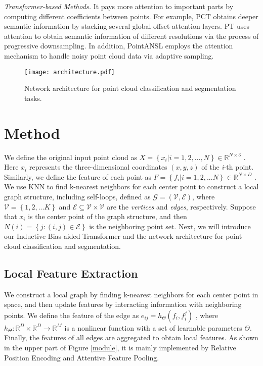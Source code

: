 \documentclass[conference]{IEEEtran}
\begin{document}
\emph{Transformer-based Methods.} It pays more attention to important parts by computing different coefficients between points. For example, PCT \cite{guo2021pct} obtains deeper semantic information by stacking several global offset attention layers. PT \cite{zhao2021point} uses attention to obtain semantic information of different resolutions via the process of progressive downsampling. In addition, PointANSL \cite{yan2020pointasnl} employs the attention mechanism to handle noisy point cloud data via adaptive sampling.

\begin{figure*}[h]
    \centering
   \texttt{[image: architecture.pdf]}
   \vspace{-5pt}
   \caption{Network architecture for point cloud classification and segmentation tasks.}
\label{architecture}
   \vspace{-8pt}
\end{figure*}

\vspace{-0.3cm}

\section{Method}
 We define the original input point cloud as $X=\left\{x_i|i = 1,2,...,N\right\}\in\mathbb{R}^{N\times3}$ . Here $x_i$ represents the three-dimensional coordinates $(x,y,z)$ of the {\emph i}-th point. Similarly, we define the feature of each point as $F=\left\{f_i|i = 1,2,...N\right\}\in\mathbb{R}^{N\times D}$ . We use KNN to find k-nearest neighbors for each center point to construct a local graph structure, including self-loops, defined as $\mathcal{G}=(\mathcal{V},\mathcal{E})$, where $\mathcal{V}=\left\{1,2,...K\right\}$ and $\mathcal{E}\subseteq \mathcal{V}\times\mathcal{V}$ are the {\em vertices} and {\em edges}, respectively. Suppose that $x_i$ is the center point of the graph structure, and then $N(i)=\left\{j:(i,j)\in\mathcal{E}\right\}$ is the neighboring point set. Next, we will introduce our Inductive Bias-aided Transformer and the network architecture for point cloud classification and segmentation.
\subsection{Local Feature Extraction}
We construct a local graph by finding k-nearest neighbors for each center point in space, and then update features by interacting information with neighboring points. We define the feature of the edge as $e_{ij} = h_\Theta(f_i,f_i^j)$ , where $h_\Theta:\mathbb{R}^D \times \mathbb{R}^D \rightarrow \mathbb{R}^{M}$ is a nonlinear function with a set of learnable parameters $\Theta$. Finally, the features of all edges are aggregated to obtain local features. As shown in the upper part of Figure \ref{module}, it is mainly implemented by Relative Position Encoding and Attentive Feature Pooling.
\end{document}
